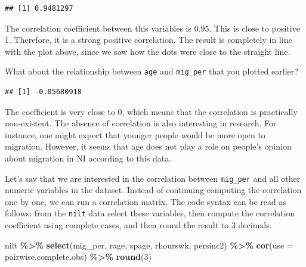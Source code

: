 \documentclass[
]{book}
\newenvironment{Shaded}{\begin{snugshade}}{\end{snugshade}}
\newcommand{\AttributeTok}[1]{\textcolor[rgb]{0.13,0.29,0.53}{#1}}
\newcommand{\DecValTok}[1]{\textcolor[rgb]{0.00,0.00,0.81}{#1}}
\newcommand{\FunctionTok}[1]{\textcolor[rgb]{0.13,0.29,0.53}{\textbf{#1}}}
\newcommand{\NormalTok}[1]{#1}
\newcommand{\SpecialCharTok}[1]{\textcolor[rgb]{0.81,0.36,0.00}{\textbf{#1}}}
\newcommand{\StringTok}[1]{\textcolor[rgb]{0.31,0.60,0.02}{#1}}
\begin{document}
\begin{verbatim}
## [1] 0.9481297
\end{verbatim}

The correlation coefficient between this variables is 0.95. This is close to positive 1. Therefore, it is a strong positive correlation. The result is completely in line with the plot above, since we saw how the dots were close to the straight line.

What about the relationship between \texttt{age} and \texttt{mig\_per} that you plotted earlier?

\begin{Shaded}
\end{Shaded}

\begin{verbatim}
## [1] -0.05680918
\end{verbatim}

The coefficient is very close to 0, which means that the correlation is practically non-existent. The absence of correlation is also interesting in research. For instance, one might expect that younger people would be more open to migration. However, it seems that age does not play a role on people's opinion about migration in NI according to this data.

Let's say that we are interested in the correlation between \texttt{mig\_per} and all other numeric variables in the dataset. Instead of continuing computing the correlation one by one, we can run a correlation matrix. The code syntax can be read as follows: from the \texttt{nilt} data select these variables, then compute the correlation coefficient using complete cases, and then round the result to 3 decimals.

\begin{Shaded}
\begin{Highlighting}[]
\NormalTok{nilt }\SpecialCharTok{\%\textgreater{}\%} 
  \FunctionTok{select}\NormalTok{(mig\_per, rage, spage, rhourswk, persinc2) }\SpecialCharTok{\%\textgreater{}\%} 
  \FunctionTok{cor}\NormalTok{(}\AttributeTok{use =} \StringTok{\textquotesingle{}pairwise.complete.obs\textquotesingle{}}\NormalTok{) }\SpecialCharTok{\%\textgreater{}\%} 
  \FunctionTok{round}\NormalTok{(}\DecValTok{3}\NormalTok{)}
\end{Highlighting}
\end{Shaded}
\end{document}
